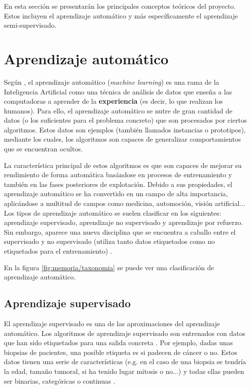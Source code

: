 
En esta sección se presentarán los principales conceptos teóricos del proyecto.
Estos incluyen el aprendizaje automático y más específicamente el aprendizaje
semi-supervisado.

\section{Aprendizaje automático}

Según \cite{intelligent:ml}, el aprendizaje automático (\textit{machine
learning}) es una rama de la Inteligencia Artificial como una técnica de
análisis de datos que enseña a las computadoras a aprender de la
\textbf{experiencia} (es decir, lo que realizan los humanos). Para ello, el
aprendizaje automático se nutre de gran cantidad de datos (o los suficientes
para el problema concreto) que son procesados por ciertos algoritmos. Estos
datos son ejemplos (también llamados instancias o prototipos), \cite{pascual:ml}
mediante los cuales, los algoritmos son capaces de generalizar comportamientos
que se encuentran ocultos. 

La característica principal de estos algoritmos es que son capaces de mejorar su
rendimiento de forma automática basándose en procesos de entrenamiento y también
en las fases posteriores de explotación. Debido a sus propiedades, el
aprendizaje automático se ha convertido en un campo de alta importancia,
aplicándose a multitud de campos como medicina, automoción, visión
artificial... Los tipos de aprendizaje automático se suelen clasificar en los
siguientes: aprendizaje supervisado, aprendizaje no supervisado y aprendizaje
por refuerzo. Sin embargo, aparece una nueva disciplina que se encuentra a
caballo entre el supervisado y no supervisado (utiliza tanto datos etiquetados
como no etiquetados para el entrenamiento) \cite{vanEngelen2020}.

En la figura \ref{fig:memoria/taxonomia} se puede ver una
clasificación de aprendizaje automático.



\subsection{Aprendizaje supervisado}

El aprendizaje supervisado es una de las aproximaciones del aprendizaje
automático. Los algoritmos de aprendizaje supervisado son entrenados con datos
que han sido etiquetados para una salida concreta \cite{david:sl}. Por ejemplo,
dadas unas biopsias de pacientes, una posible etiqueta es si padecen de cáncer o
no. Estos datos tienen una serie de características (e.g. en el caso de una
biopsia se tendría la edad, tamaño tumoral, si ha tenido lugar mitosis o no...)
y todas ellas pueden ser binarias, categóricas o continuas \cite{salim:sl}.


